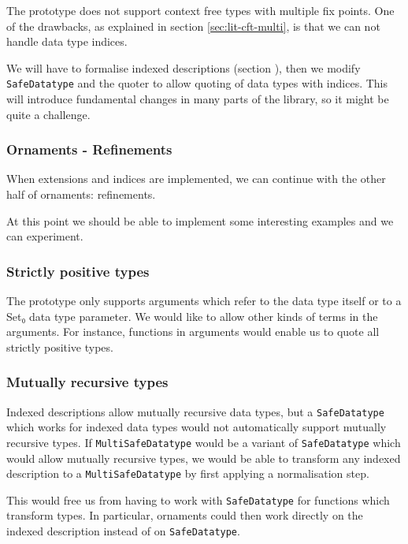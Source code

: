 The prototype does not support context free types with multiple fix
points.
One of the drawbacks, as explained in section \ref{sec:lit-cft-multi},
is that we can not handle data type indices.

We will have to formalise indexed descriptions (section
), then we modify \texttt{SafeDatatype} and the quoter to
allow quoting of data types with indices.
This will introduce fundamental changes in many parts of the library,
so it might be quite a challenge.

\subsubsection{Ornaments - Refinements}\label{sec:plan-refinements}

When extensions and indices are implemented, we can continue with the
other half of ornaments: refinements. 

At this point we should be able to implement some interesting examples
and we can experiment.

\subsubsection{Strictly positive types}\label{sec:plan-spt}

The prototype only supports arguments which refer to the data type
itself or to a Set₀ data type parameter.
We would like to allow other kinds of terms in the arguments.
For instance, functions in arguments would enable us to quote all
strictly positive types.

\subsubsection{Mutually recursive types}\label{sec:plan-mutual}

Indexed descriptions allow mutually recursive data types, but
a \texttt{SafeDatatype} which works for indexed data types would not
automatically support mutually recursive types.
If \texttt{MultiSafeDatatype} would be a variant of
\texttt{SafeDatatype} which would allow mutually recursive types, we
would be able to transform any indexed description to a
\texttt{MultiSafeDatatype} by first applying a normalisation step.

This would free us from having to work with \texttt{SafeDatatype} for
functions which transform types.
In particular, ornaments could then work directly on the indexed
description instead of on \texttt{SafeDatatype}.

